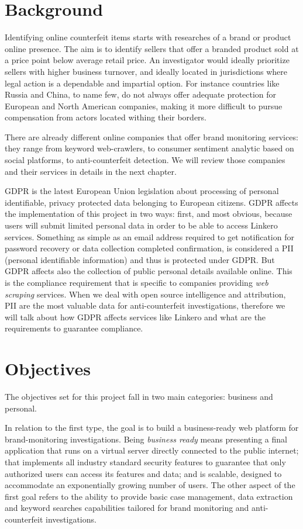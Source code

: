 \section{Background}
Identifying online counterfeit items starts with researches of a brand or
product online presence. The aim is to identify sellers that offer a branded
product sold at a price point below average retail price. An investigator would
ideally prioritize sellers with higher business turnover, and ideally located in
jurisdictions where legal action is a dependable and impartial option. For
instance countries like Russia and China, to name few, do not always offer
adequate protection for European and North American companies, making it more difficult to pursue
compensation from actors located withing their borders.

There are already different online companies that offer brand monitoring
services: they range from keyword web-crawlers, to consumer sentiment analytic
based on social platforms, to anti-counterfeit detection. We will review those
companies and their services in details in the next chapter.

GDPR is the latest European Union legislation about processing of personal
identifiable, privacy protected data belonging to European citizens. GDPR
affects the implementation of this project in two ways: first, and most obvious,
because users will submit limited personal data in order to be able to access
Linkero services. Something as simple as an email address required to get
notification for password recovery or data collection completed confirmation, is
considered a PII (personal identifiable information) and thus is protected under
GDPR. But GDPR affects also the collection of public personal details available
online. This is the compliance requirement that is specific to companies
providing \emph{web scraping} services. When we deal with open source
intelligence and attribution, PII are the most valuable data for
anti-counterfeit investigations, therefore we will talk about how GDPR affects
services like Linkero and what are the requirements to guarantee compliance.


\section{Objectives}
The objectives set for this project fall in two main categories: business
and personal.

In relation to the first type, the goal is to build a business-ready web
platform for brand-monitoring investigations. Being \emph{business ready}
means presenting a final application that runs on a virtual server directly
connected to the public internet; that implements all industry standard
security features to guarantee that only authorized users can access its
features and data; and is scalable, designed to accommodate an exponentially
growing number of users. The other aspect of the first goal refers to the ability to
provide basic case management, data extraction and keyword searches capabilities
tailored for brand monitoring and anti-counterfeit investigations.

